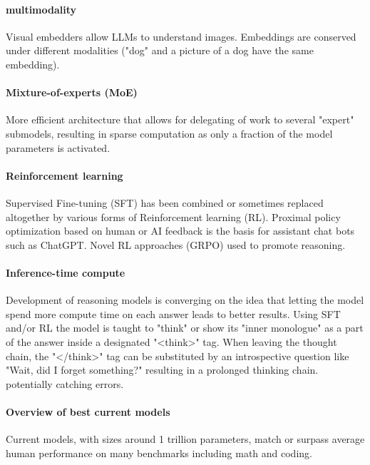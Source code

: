 \paragraph{multimodality}
Visual embedders allow LLMs to understand images. Embeddings are conserved under different modalities ("dog" and a picture of a dog have the same embedding).
\paragraph{Mixture-of-experts (MoE)}
More efficient architecture that allows for delegating of work to several "expert" submodels, resulting in sparse computation as only a fraction of the model parameters is activated.
\paragraph{Reinforcement learning}
Supervised Fine-tuning (SFT) has been combined or sometimes replaced altogether by various forms of Reinforcement learning (RL).
Proximal policy optimization based on human or AI feedback is the basis for assistant chat bots such as ChatGPT.
Novel RL approaches (GRPO) used to promote reasoning.
\paragraph{Inference-time compute}
Development of reasoning models is converging on the idea that letting the model spend more compute time on each answer leads to better results.
Using SFT and/or RL the model is taught to "think" or show its "inner monologue" as a part of the answer inside a designated "<think>" tag.
When leaving the thought chain, the "</think>" tag can be substituted by an introspective question like "Wait, did I forget something?" resulting in a prolonged thinking chain. 
potentially catching errors.
\paragraph{Overview of best current models}
Current models, with sizes around 1 trillion parameters, match or surpass average human performance on many benchmarks including math and coding.
